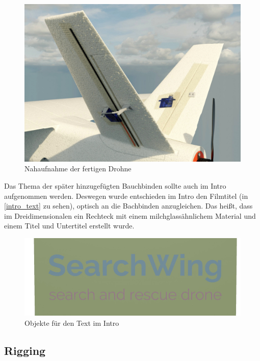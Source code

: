 \begin{figure}[H]
\begin{center}
\includegraphics[width=\textwidth]{gfx/prod/plane/shading.jpg}
\caption{Nahaufnahme der fertigen Drohne}
\label{shading}
\end{center}
\end{figure}

Das Thema der später hinzugefügten Bauchbinden sollte auch im Intro aufgenommen werden. Deswegen wurde entschieden im Intro den Filmtitel (in \autoref{intro_text} zu sehen), optisch an die Bachbinden anzugleichen. Das heißt, dass im Dreidimensionalen ein Rechteck mit einem milchglassähnlichem Material und einem Titel und Untertitel erstellt wurde.

\begin{figure}[H]
\begin{center}
\includegraphics[width=\textwidth]{gfx/prod/env/intro_text.jpg}
\caption{Objekte für den Text im Intro}
\label{intro_text}
\end{center}
\end{figure}

\subsection{Rigging}

